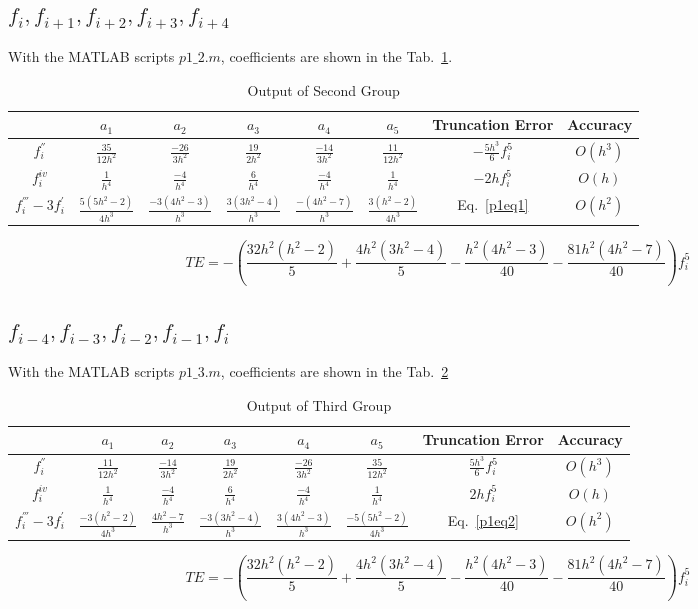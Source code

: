 \documentclass[letterpaper,10pt]{article}
\begin{document}
\subsection{$f_{i},f_{i+1},f_{i+2},f_{i+3},f_{i+4}$}
With the MATLAB scripts $p1\_2.m$, coefficients are shown in the Tab.~\ref{tab1_2}.  
\begin{table}[htbp]
  \centering  
  \caption{Output of Second Group}\label{tab1_2}
  \begin{tabular}{cccccccc}
    \hline
    & $a_1$ & $a_2$ & $a_3$ & $a_4$& $a_5$ & Truncation Error& Accuracy\\
    \hline
    $f_{i}^{''}$ & $\frac{35}{12h^2}$ & $\frac{-26}{3h^2}$ & $\frac{19}{2h^2}$ & $\frac{-14}{3h^2}$ & $\frac{11}{12h^2}$ & $-\frac{5h^3}{6}f_{i}^{5}$& $O\left(h^3\right)$\\
    $f_{i}^{iv}$ & $\frac{1}{h^4}$ & $\frac{-4}{h^4}$ & $\frac{6}{h^4}$ & $\frac{-4}{h^4}$ & $\frac{1}{h^4}$ & $-2hf_{i}^{5}$& $O\left(h\right)$\\
    $f_{i}^{'''}-3f_{i}^{'}$ & $\frac{5\left(5h^2-2\right)}{4h^3}$ & $\frac{-3\left(4h^2-3\right)}{h^3}$ & $\frac{3\left(3h^2-4\right)}{h^3}$ & $\frac{-\left(4h^2-7\right)}{h^3}$ & $\frac{3\left(h^2-2\right)}{4h^3}$ & Eq.~\ref{p1eq1}&$O\left(h^2\right)$\\
    \hline
  \end{tabular}
\end{table}
\begin{equation}\label{p1eq1}
  TE = -\left(\frac{32h^2(h^2 - 2)}{5} + \frac{4h^2(3h^2 - 4)}{5} - \frac{h^2(4h^2 - 3)}{40} - \frac{81h^2(4h^2 - 7)}{40}\right)f_{i}^{5}
\end{equation}
\subsection{$f_{i-4},f_{i-3},f_{i-2},f_{i-1},f_{i}$}
With the MATLAB scripts $p1\_3.m$, coefficients are shown in the Tab.~\ref{tab1_3}
\begin{table}[htbp]
  \centering  
  \caption{Output of Third Group}\label{tab1_3}
  \begin{tabular}{cccccccc}
    \hline
    & $a_1$ & $a_2$ & $a_3$ & $a_4$& $a_5$ & Truncation Error& Accuracy\\
    \hline
    $f_{i}^{''}$ & $\frac{11}{12h^2}$ & $\frac{-14}{3h^2}$ & $\frac{19}{2h^2}$ & $\frac{-26}{3h^2}$ & $\frac{35}{12h^2}$ & $\frac{5h^3}{6}f_{i}^{5}$& $O\left(h^3\right)$\\
    $f_{i}^{iv}$ & $\frac{1}{h^4}$ & $\frac{-4}{h^4}$ & $\frac{6}{h^4}$ & $\frac{-4}{h^4}$ & $\frac{1}{h^4}$ & $2hf_{i}^{5}$& $O\left(h\right)$\\
    $f_{i}^{'''}-3f_{i}^{'}$ & $\frac{-3\left(h^2-2\right)}{4h^3}$ & $\frac{4h^2-7}{h^3}$ & $\frac{-3\left(3h^2-4\right)}{h^3}$ & $\frac{3\left(4h^2-3\right)}{h^3}$ & $\frac{-5\left(5h^2-2\right)}{4h^3}$ & Eq.~\ref{p1eq2}&$O\left(h^2\right)$\\
    \hline
  \end{tabular}
\end{table}
\begin{equation}\label{p1eq2}
  TE = -\left(\frac{32h^2(h^2 - 2)}{5} + \frac{4h^2(3h^2 - 4)}{5} - \frac{h^2(4h^2 - 3)}{40} - \frac{81h^2(4h^2 - 7)}{40}\right)f_{i}^{5}
\end{equation}
\end{document}
